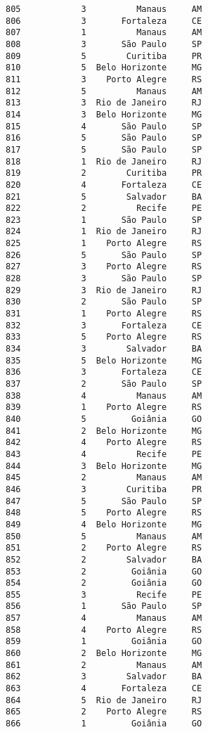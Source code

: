 \documentclass[11pt]{article}
\begin{document}
\begin{Verbatim}[commandchars=\\\{\}]
805            3          Manaus     AM  
806            3       Fortaleza     CE  
807            1          Manaus     AM  
808            3       São Paulo     SP  
809            5        Curitiba     PR  
810            5  Belo Horizonte     MG  
811            3    Porto Alegre     RS  
812            5          Manaus     AM  
813            3  Rio de Janeiro     RJ  
814            3  Belo Horizonte     MG  
815            4       São Paulo     SP  
816            5       São Paulo     SP  
817            5       São Paulo     SP  
818            1  Rio de Janeiro     RJ  
819            2        Curitiba     PR  
820            4       Fortaleza     CE  
821            5        Salvador     BA  
822            2          Recife     PE  
823            1       São Paulo     SP  
824            1  Rio de Janeiro     RJ  
825            1    Porto Alegre     RS  
826            5       São Paulo     SP  
827            3    Porto Alegre     RS  
828            3       São Paulo     SP  
829            3  Rio de Janeiro     RJ  
830            2       São Paulo     SP  
831            1    Porto Alegre     RS  
832            3       Fortaleza     CE  
833            5    Porto Alegre     RS  
834            3        Salvador     BA  
835            5  Belo Horizonte     MG  
836            3       Fortaleza     CE  
837            2       São Paulo     SP  
838            4          Manaus     AM  
839            1    Porto Alegre     RS  
840            5         Goiânia     GO  
841            2  Belo Horizonte     MG  
842            4    Porto Alegre     RS  
843            4          Recife     PE  
844            3  Belo Horizonte     MG  
845            2          Manaus     AM  
846            3        Curitiba     PR  
847            5       São Paulo     SP  
848            5    Porto Alegre     RS  
849            4  Belo Horizonte     MG  
850            5          Manaus     AM  
851            2    Porto Alegre     RS  
852            2        Salvador     BA  
853            2         Goiânia     GO  
854            2         Goiânia     GO  
855            3          Recife     PE  
856            1       São Paulo     SP  
857            4          Manaus     AM  
858            4    Porto Alegre     RS  
859            1         Goiânia     GO  
860            2  Belo Horizonte     MG  
861            2          Manaus     AM  
862            3        Salvador     BA  
863            4       Fortaleza     CE  
864            5  Rio de Janeiro     RJ  
865            2    Porto Alegre     RS  
866            1         Goiânia     GO  

\end{Verbatim}
\end{document}
